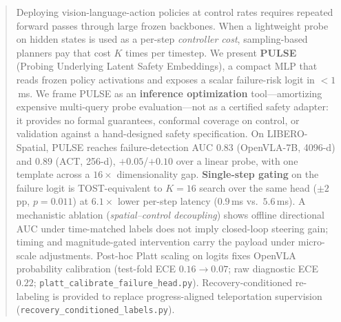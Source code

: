 \begin{abstract}
Deploying vision-language-action policies at control rates requires repeated forward passes through large frozen backbones. When a lightweight probe on hidden states is used as a per-step \emph{controller cost}, sampling-based planners pay that cost $K$ times per timestep. We present \textbf{PULSE} (Probing Underlying Latent Safety Embeddings), a compact MLP that reads frozen policy activations and exposes a scalar failure-risk logit in ${<}1$\,ms. We frame PULSE as an \textbf{inference optimization} tool---amortizing expensive multi-query probe evaluation---not as a certified safety adapter: it provides no formal guarantees, conformal coverage on control, or validation against a hand-designed safety specification. On LIBERO-Spatial, PULSE reaches failure-detection AUC $0.83$ (OpenVLA-7B, 4096-d) and $0.89$ (ACT, 256-d), $+0.05$/$+0.10$ over a linear probe, with one template across a $16{\times}$ dimensionality gap. \textbf{Single-step gating} on the failure logit is TOST-equivalent to $K{=}16$ search over the same head (${\pm}2$\,pp, $p{=}0.011$) at $\mathbf{6.1{\times}}$ lower per-step latency ($0.9$\,ms vs.\ $5.6$\,ms). A mechanistic ablation (\emph{spatial--control decoupling}) shows offline directional AUC under time-matched labels does not imply closed-loop steering gain; timing and magnitude-gated intervention carry the payload under micro-scale adjustments. Post-hoc Platt scaling on logits fixes OpenVLA probability calibration (test-fold ECE $0.16{\to}0.07$; raw diagnostic ECE $0.22$; \texttt{platt\_calibrate\_failure\_head.py}). Recovery-conditioned re-labeling is provided to replace progress-aligned teleportation supervision (\texttt{recovery\_conditioned\_labels.py}).
\end{abstract}
